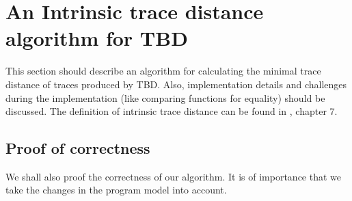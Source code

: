 \section{An Intrinsic trace distance algorithm for TBD}
This section should describe an algorithm for calculating the minimal trace distance of traces produced by TBD. Also, implementation details and challenges during the implementation (like comparing functions for equality) should be discussed. The definition of intrinsic trace distance can be found in \cite{Acar2005thesis}, chapter 7. 

\subsection{Proof of correctness}
We shall also proof the correctness of our algorithm. It is of importance that we take the changes in the program model into account. 